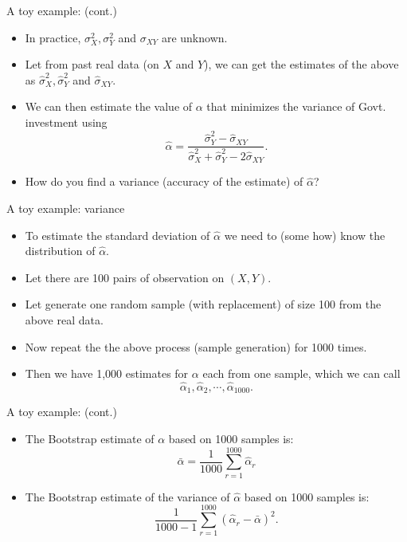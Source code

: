 \documentclass[
  ignorenonframetext,
]{beamer}
\providecommand{\tightlist}{%
  \setlength{\itemsep}{0pt}\setlength{\parskip}{0pt}}
\begin{document}
\begin{frame}{A toy example: (cont.)}
\label{a-toy-example-cont.}
\begin{itemize}
\tightlist
\item
  In practice, \(\sigma_{X}^2, \sigma_{Y}^2\) and \(\sigma_{XY}\) are
  unknown.
\item
  Let from past real data (on \(X\) and \(Y\)), we can get the estimates
  of the above as \(\hat\sigma_{X}^2, \hat\sigma_{Y}^2\) and
  \(\hat\sigma_{XY}\).
\item
  We can then estimate the value of \(\alpha\) that minimizes the
  variance of Govt. investment using
  \[\hat\alpha = \frac{\hat\sigma_{Y}^2 - \hat\sigma_{XY}}{\hat\sigma_{X}^2 + \hat\sigma_{Y}^2 - 2\hat\sigma_{XY}}.\]
\item
  How do you find a variance (accuracy of the estimate) of
  \(\hat \alpha\)?
\end{itemize}
\end{frame}

\begin{frame}{A toy example: variance}
\label{a-toy-example-variance}
\begin{itemize}
\tightlist
\item
  To estimate the standard deviation of \(\hat \alpha\) we need to (some
  how) know the distribution of \(\hat \alpha\).
\item
  Let there are 100 pairs of observation on \((X, Y)\).
\item
  Let generate one random sample (with replacement) of size 100 from the
  above real data.
\item
  Now repeat the the above process (sample generation) for 1000 times.
\item
  Then we have 1,000 estimates for \(\alpha\) each from one sample,
  which we can call
  \[\hat\alpha_1, \hat\alpha_2, \cdots, \hat\alpha_{1000}.\]
\end{itemize}
\end{frame}

\begin{frame}{A toy example: (cont.)}
\label{a-toy-example-cont.-1}
\begin{itemize}
\tightlist
\item
  The Bootstrap estimate of \(\alpha\) based on 1000 samples is:
  \[\bar{\alpha} = \frac{1}{1000} \sum_{r=1}^{1000} \hat{\alpha}_r\]
\item
  The Bootstrap estimate of the variance of \(\hat\alpha\) based on 1000
  samples is:
  \[\frac{1}{1000-1} \sum_{r=1}^{1000}(\hat{\alpha}_r - \bar{\alpha})^2.\]
\end{itemize}
\end{frame}
\end{document}
